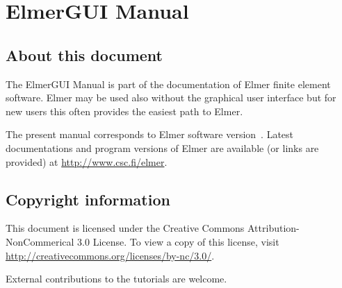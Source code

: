 \chapter*{ElmerGUI Manual}

\section*{About this document}

The ElmerGUI Manual is part of the documentation of 
Elmer finite element software. Elmer may be used also without the
graphical user interface but for new users this often
provides the easiest path to Elmer. 

The present manual
corresponds to Elmer software version~\elmerversion{}.
Latest documentations and program versions of Elmer are available (or links are provided) at 
\url{http://www.csc.fi/elmer}. 

\section*{Copyright information}

This document is licensed under the Creative Commons Attribution-NonCommerical 3.0 License. 
To view a copy of this license, visit \url{http://creativecommons.org/licenses/by-nc/3.0/}.

External contributions to the tutorials are welcome. 


